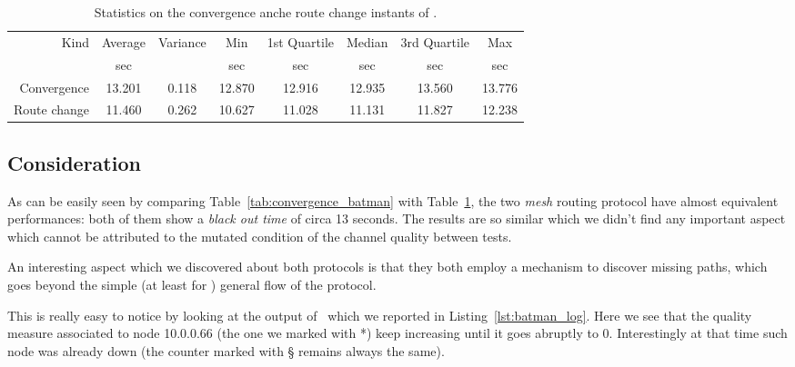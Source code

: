        \begin{table}[htbp]
            \centering
            \begin{tabular}{rccccccc}
            \toprule
            Kind & Average & Variance & Min & 1st Quartile &
            Median & 3rd Quartile & Max \\
            & \footnotesize{sec} & & \footnotesize{sec} & \footnotesize{sec} &
            \footnotesize{sec} & \footnotesize{sec} & \footnotesize{sec} \\
            \midrule
            Convergence & 13.201 & 0.118 & 12.870 & 12.916 & 12.935 & 13.560 &13.776 \\
            Route change & 11.460 & 0.262 & 10.627 & 11.028 & 11.131 &11.827 & 12.238 \\
            \bottomrule
            \end{tabular}
           \caption{Statistics on the convergence anche route change
              instants of \olsr.}
            \label{tab:convergence_olsr}
        \end{table}

\subsection{Consideration}
As can be easily seen by comparing Table~\ref{tab:convergence_batman}
with Table~\ref{tab:convergence_olsr}, the two \emph{mesh} routing
protocol have almost equivalent performances: both of them show a
\emph{black out time} of circa 13 seconds. The results are so similar
which we didn't find any important aspect which cannot be attributed
to the mutated condition of the channel quality between tests.

An interesting aspect which we discovered about both protocols is that
they both employ a mechanism to discover missing paths, which goes
beyond the simple (at least for \batman) general flow of the
protocol.

This is really easy to notice by looking at the output of \batman\ which
we reported in Listing~\ref{lst:batman_log}. Here we see that the
quality measure associated to node 10.0.0.66 (the one we marked with
*) keep increasing until it goes abruptly to 0. Interestingly at that
time such node was already down (the counter marked with § remains
always the same).

